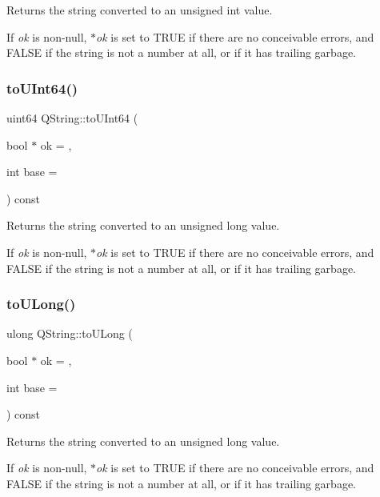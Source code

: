 Returns the string converted to an {\ttfamily unsigned int} value.

If {\itshape ok} is non-\/null, {\itshape $\ast$ok} is set to T\+R\+UE if there are no conceivable errors, and F\+A\+L\+SE if the string is not a number at all, or if it has trailing garbage. \mbox{\label{class_q_string_a3f39cb56a6f77eabc5e3e81cb483fabc}} 
\subsubsection{\texorpdfstring{toUInt64()}{toUInt64()}}
{\footnotesize\ttfamily uint64 Q\+String\+::to\+U\+Int64 (\begin{DoxyParamCaption}\item[{bool $\ast$}]{ok = {},  }\item[{int}]{base = {} }\end{DoxyParamCaption}) const}

Returns the string converted to an {\ttfamily unsigned long} value.

If {\itshape ok} is non-\/null, {\itshape $\ast$ok} is set to T\+R\+UE if there are no conceivable errors, and F\+A\+L\+SE if the string is not a number at all, or if it has trailing garbage. \mbox{\label{class_q_string_aad9a32a624e392837a639b418f243c67}} 
\subsubsection{\texorpdfstring{toULong()}{toULong()}}
{\footnotesize\ttfamily ulong Q\+String\+::to\+U\+Long (\begin{DoxyParamCaption}\item[{bool $\ast$}]{ok = {},  }\item[{int}]{base = {} }\end{DoxyParamCaption}) const}

Returns the string converted to an {\ttfamily unsigned long} value.

If {\itshape ok} is non-\/null, {\itshape $\ast$ok} is set to T\+R\+UE if there are no conceivable errors, and F\+A\+L\+SE if the string is not a number at all, or if it has trailing garbage. \mbox{\label{class_q_string_a1ef1df5d1b79c0bd01115f39078f1334}} 
